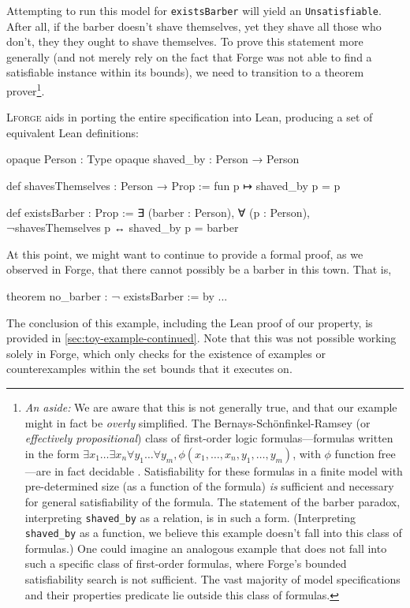 Attempting to run this model for \texttt{existsBarber} will yield an \texttt{Unsatisfiable}. After all, if the barber doesn't shave themselves, yet they shave all those who don't, they they ought to shave themselves. To prove this statement more generally (and not merely rely on the fact that Forge was not able to find a satisfiable instance within its bounds), we need to transition to a theorem prover\footnote{\emph{An aside:} We are aware that this is not generally true, and that our example might in fact be \emph{overly} simplified. The Bernays-Sch\"onfinkel-Ramsey (or \emph{effectively propositional}) class of first-order logic formulas---formulas written in the form $\exists x_1 \dots \exists x_n \forall y_1 \dots \forall y_m, \phi(x_1, \dots, x_n, y_1, \dots, y_m)$, with $\phi$ function free---are in fact decidable \cite{bernays1928entscheidungsproblem,ramsey1987problem}. Satisfiability for these formulas in a finite model with pre-determined size (as a function of the formula) \emph{is} sufficient and necessary for general satisfiability of the formula. The statement of the barber paradox, interpreting \texttt{shaved_by} as a relation, is in such a form. (Interpreting \texttt{shaved_by} as a function, we believe this example doesn't fall into this class of formulas.) One could imagine an analogous example that does not fall into such a specific class of first-order formulas, where Forge's bounded satisfiability search is not sufficient. The vast majority of model specifications and their properties predicate lie outside this class of formulas.}. 

\textsc{Lforge} aids in porting the entire specification into Lean, producing a set of equivalent Lean definitions: 

\begin{lean*}
opaque Person : Type
opaque shaved_by : Person → Person

def shavesThemselves : Person → Prop :=
  fun p ↦ shaved_by p = p

def existsBarber : Prop :=
  ∃ (barber : Person), ∀ (p : Person), ¬shavesThemselves p ↔ shaved_by p = barber
\end{lean*}
At this point, we might want to continue to provide a formal proof, as we observed in Forge, that there cannot possibly be a barber in this town. That is, 

\begin{lean*}
theorem no_barber : ¬ existsBarber := by ...
\end{lean*}

The conclusion of this example, including the Lean proof of our property, is provided in \cref{sec:toy-example-continued}. Note that this was not possible working solely in Forge, which only checks for the existence of examples or counterexamples within the set bounds that it executes on. 

